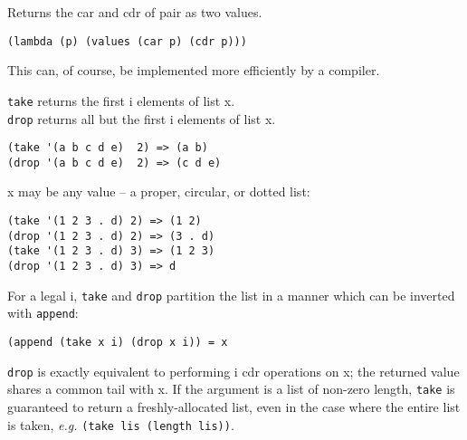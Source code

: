 \begin{entry}{%
  }

  Returns the car and cdr of pair as two values.

\begin{verbatim}
(lambda (p) (values (car p) (cdr p)))
\end{verbatim}

  This can, of course, be implemented more efficiently by a compiler.
\end{entry}

\begin{entry}{%
  }

  \texttt{take} returns the first i elements of list x.\\
  \texttt{drop} returns all but the first i elements of list x.

\begin{verbatim}
(take '(a b c d e)  2) => (a b)
(drop '(a b c d e)  2) => (c d e)
\end{verbatim}

  x may be any value -- a proper, circular, or dotted list:

\begin{verbatim}
(take '(1 2 3 . d) 2) => (1 2)
(drop '(1 2 3 . d) 2) => (3 . d)
(take '(1 2 3 . d) 3) => (1 2 3)
(drop '(1 2 3 . d) 3) => d
\end{verbatim}

  For a legal i, \texttt{take} and \texttt{drop} partition the list in
  a manner which can be inverted with \texttt{append}:

\begin{verbatim}
(append (take x i) (drop x i)) = x
\end{verbatim}

  \texttt{drop} is exactly equivalent to performing i cdr operations
  on x; the returned value shares a common tail with x. If the
  argument is a list of non-zero length, \texttt{take} is guaranteed
  to return a freshly-allocated list, even in the case where the
  entire list is taken, \emph{e.g.} \texttt{(take\ lis\ (length\
    lis))}.
\end{entry}


